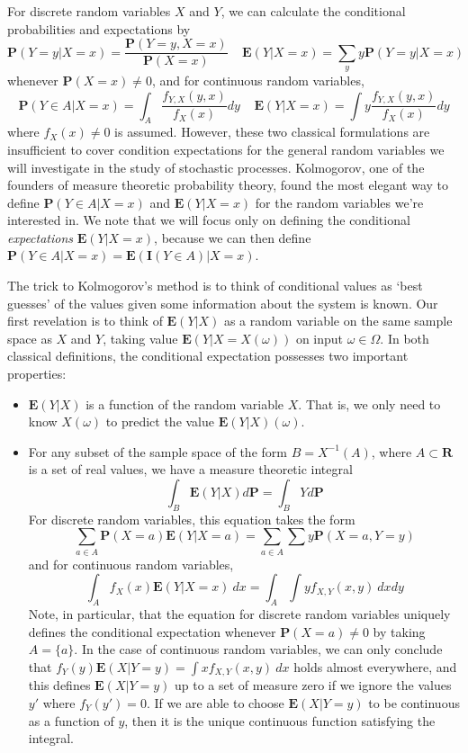 
For discrete random variables $X$ and $Y$, we can calculate the conditional probabilities and expectations by
%
\[ \mathbf{P}(Y = y | X = x) = \frac{\mathbf{P}(Y = y, X = x)}{\mathbf{P}(X = x)}\ \ \ \ \ \mathbf{E}(Y|X = x) = \sum_y y \mathbf{P}(Y = y|X=x) \]
%
whenever $\mathbf{P}(X = x) \neq 0$, and for continuous random variables,
%
\[ \mathbf{P}(Y \in A | X = x) = \int_A \frac{f_{Y,X}(y,x)}{f_X(x)} dy\ \ \ \ \ \mathbf{E}(Y|X = x) = \int y \frac{f_{Y,X}(y,x)}{f_X(x)} dy \]
%
where $f_X(x) \neq 0$ is assumed. However, these two classical formulations are insufficient to cover condition expectations for the general random variables we will investigate in the study of stochastic processes. Kolmogorov, one of the founders of measure theoretic probability theory, found the most elegant way to define $\mathbf{P}(Y \in A | X = x)$ and $\mathbf{E}(Y|X=x)$ for the random variables we're interested in. We note that we will focus only on defining the conditional {\it expectations} $\mathbf{E}(Y|X=x)$, because we can then define $\mathbf{P}(Y \in A | X = x) = \mathbf{E}(\mathbf{I}(Y \in A)|X = x)$.

The trick to Kolmogorov's method is to think of conditional values as `best guesses' of the values given some information about the system is known. Our first revelation is to think of $\mathbf{E}(Y|X)$ as a random variable on the same sample space as $X$ and $Y$, taking value $\mathbf{E}(Y|X=X(\omega))$ on input $\omega \in \Omega$. In both classical definitions, the conditional expectation possesses two important properties:
%
\begin{itemize}
    \item $\mathbf{E}(Y|X)$ is a function of the random variable $X$. That is, we only need to know $X(\omega)$ to predict the value $\mathbf{E}(Y|X)(\omega)$.

    \item For any subset of the sample space of the form $B = X^{-1}(A)$, where $A \subset \mathbf{R}$ is a set of real values, we have a measure theoretic integral
    \[ \int_B \mathbf{E}(Y|X) d\mathbf{P} = \int_B Y d\mathbf{P} \]
    For discrete random variables, this equation takes the form
    \[ \sum_{a \in A} \mathbf{P}(X = a) \mathbf{E}(Y|X = a) = \sum_{a \in A} \sum y \mathbf{P}(X = a, Y = y) \]
    and for continuous random variables,
    \[ \int_A f_X(x) \mathbf{E}(Y|X=x)\ dx = \int_A \int y f_{X,Y}(x,y)\ dx dy \]
    Note, in particular, that the equation for discrete random variables uniquely defines the conditional expectation whenever $\mathbf{P}(X = a) \neq 0$ by taking $A = \{ a \}$. In the case of continuous random variables, we can only conclude that $f_Y(y) \mathbf{E}(X|Y=y) = \int x f_{X,Y}(x,y)\ dx$ holds almost everywhere, and this defines $\mathbf{E}(X|Y=y)$ up to a set of measure zero if we ignore the values $y'$ where $f_Y(y') = 0$. If we are able to choose $\mathbf{E}(X|Y=y)$ to be continuous as a function of $y$, then it is the unique continuous function satisfying the integral.
\end{itemize}

